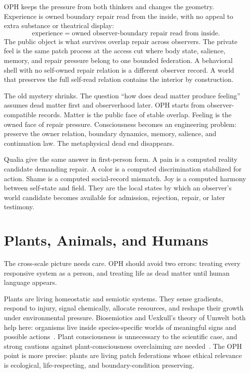 \documentclass[11pt]{article}
\theoremstyle{remark}
\theoremstyle{plain}
\begin{document}
OPH keeps the pressure from both thinkers and changes the geometry. Experience
is owned boundary repair read from the inside, with no appeal to extra substance
or theatrical display:
\[
\boxed{
\text{experience}=\text{owned observer-boundary repair read from inside}.
}
\]
The public object is what survives overlap repair across observers. The private
feel is the same patch process at the access cut where body state, salience,
memory, and repair pressure belong to one bounded federation. A behavioral shell
with no self-owned repair relation is a different observer record. A world that
preserves the full self-read relation contains the interior by construction.

The old mystery shrinks. The question ``how does dead matter produce feeling''
assumes dead matter first and observerhood later. OPH starts from
observer-compatible records. Matter is the public face of stable overlap.
Feeling is the owned face of repair pressure. Consciousness becomes an
engineering problem: preserve the owner relation, boundary dynamics, memory,
salience, and continuation law. The metaphysical dead end disappears.

Qualia give the same answer in first-person form. A pain is a computed reality
candidate demanding repair. A color is a computed discrimination stabilized for
action. Shame is a computed social-record mismatch. Joy is a computed harmony
between self-state and field. They are the local states by which an observer's
world candidate becomes available
for admission, rejection, repair, or later testimony.

\section{Plants, Animals, and Humans}

The cross-scale picture needs care. OPH should avoid two errors: treating
every responsive system as a person, and treating life as dead matter until
human language appears.

Plants are living homeostatic and semiotic systems. They sense gradients,
respond to injury, signal chemically, allocate resources, and reshape their
growth under environmental pressure. Biosemiotics and Uexkull's theory of
Umwelt both help here: organisms live inside species-specific worlds of
meaningful signs and possible actions~\cite{Uexkull1934,Hoffmeyer2008,Hornborg2024}.
Plant consciousness is unnecessary to the scientific case, and strong cautions
against plant-consciousness overclaiming are needed~\cite{Taiz2019}. The
OPH point is more precise: plants are living patch
federations whose ethical relevance is ecological, life-respecting, and
boundary-condition preserving.
\end{document}
